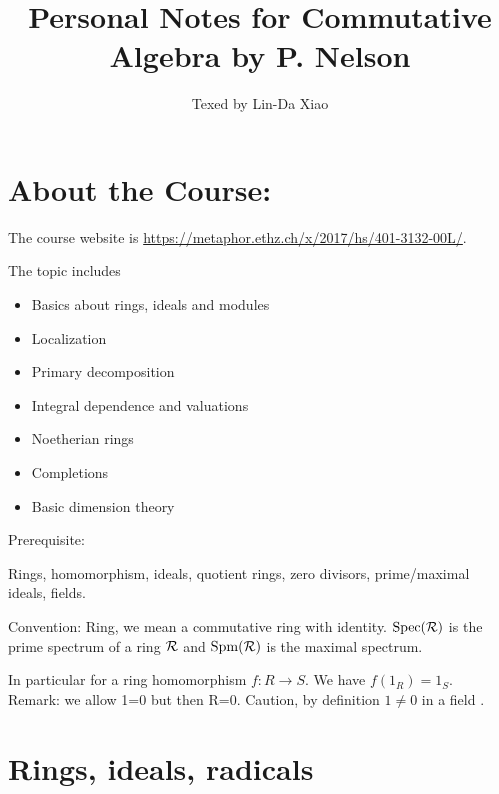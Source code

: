 \documentclass[11pt]{article}
\title{\bf Personal Notes for Commutative Algebra by P. Nelson}
\author{Texed by Lin-Da Xiao} %
\newcommand{\calr}{{\cal R}}
\begin{document}
\maketitle
\tableofcontents
\newpage

\section*{About the Course:}
The course website is \href{https://metaphor.ethz.ch/x/2017/hs/401-3132-00L/}{https://metaphor.ethz.ch/x/2017/hs/401-3132-00L/}. 

The topic includes
\begin{itemize}
\item 
Basics about rings, ideals and modules
\item 
Localization
\item 
Primary decomposition
\item 
Integral dependence and valuations
\item 
Noetherian rings
\item 
Completions
\item 
Basic dimension theory
\end{itemize}

Prerequisite:

Rings, homomorphism, ideals, quotient rings, zero divisors, prime/maximal ideals, fields.

Convention: 
Ring, we mean a commutative ring with identity. $\text{Spec}(\calr)$ is the prime spectrum of a ring $\calr$ and $\text{Spm}(\calr)$ is the maximal spectrum.

In particular for a ring homomorphism $f:R\rightarrow S$. We have $f(1_R)=1_S$.
 
Remark:
we allow 1=0 but then R=0.
Caution, by definition $1\neq 0$ in a field .
\section{Rings, ideals, radicals}
\end{document}
